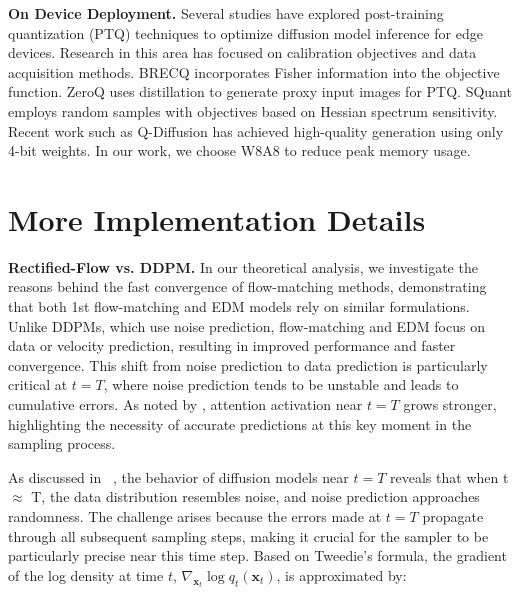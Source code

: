 \noindent \textbf{On Device Deployment.}
Several studies have explored post-training quantization (PTQ) techniques to optimize diffusion model inference for edge devices. Research in this area has focused on calibration objectives and data acquisition methods. BRECQ \citep{li2021brecq} incorporates Fisher information into the objective function. ZeroQ \citep{Cai2020ZeroQAN} uses distillation to generate proxy input images for PTQ. SQuant \citep{Guo2022SQuantOD} employs random samples with objectives based on Hessian spectrum sensitivity. Recent work such as Q-Diffusion \citep{li2023qdiffusion} has achieved high-quality generation using only 4-bit weights. In our work, we choose W8A8 to reduce peak memory usage.


\section{More Implementation Details}

\noindent \textbf{Rectified-Flow vs. DDPM.}
In our theoretical analysis, we investigate the reasons behind the fast convergence of flow-matching methods, demonstrating that both 1st flow-matching and EDM models rely on similar formulations. Unlike DDPMs, which use noise prediction, flow-matching and EDM focus on data or velocity prediction, resulting in improved performance and faster convergence. This shift from noise prediction to data prediction is particularly critical at $t = T$, where noise prediction tends to be unstable and leads to cumulative errors. As noted by \cite{balaji2022ediff}, attention activation near $t = T$ grows stronger, highlighting the necessity of accurate predictions at this key moment in the sampling process.

As discussed in ~\cite{lu2023reverse}, the behavior of diffusion models near $t = T$ reveals that when t $\approx$ T, the data distribution resembles noise, and noise prediction approaches randomness. The challenge arises because the errors made at $t = T$ propagate through all subsequent sampling steps, making it crucial for the sampler to be particularly precise near this time step.
Based on Tweedie’s formula, the gradient of the log density at time $t$, $\nabla_{\mathbf{x}_t} \log q_t(\mathbf{x}_t)$, is approximated by:

